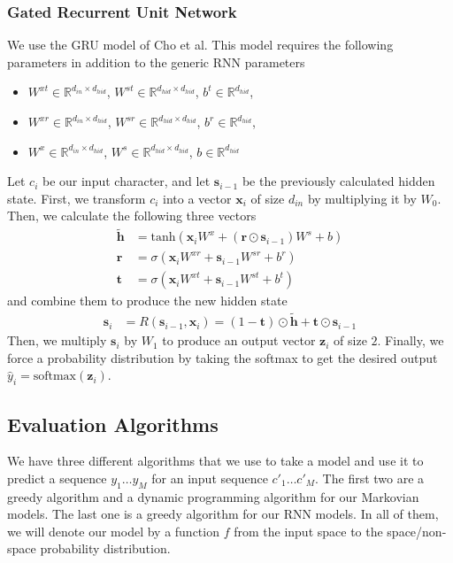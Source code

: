 \documentclass[11pt]{article}
\begin{document}
\subsubsection{Gated Recurrent Unit Network}

We use the GRU model of Cho et al. This model requires the following parameters in addition to the generic RNN parameters
\begin{itemize}
  \item $W^{xt} \in \mathbb{R}^{d_{in} \times d_{hid}}$, $W^{st} \in \mathbb{R}^{d_{hid} \times d_{hid}}$, $b^t \in \mathbb{R}^{d_{hid}}$, 
  \item $W^{xr} \in \mathbb{R}^{d_{in} \times d_{hid}}$, $W^{sr} \in \mathbb{R}^{d_{hid} \times d_{hid}}$, $b^r \in \mathbb{R}^{d_{hid}}$, 
  \item $W^x \in \mathbb{R}^{d_{in} \times d_{hid}}$, $W^s \in \mathbb{R}^{d_{hid} \times d_{hid}}$, $b \in \mathbb{R}^{d_{hid}}$
\end{itemize}

Let $c_i$ be our input character, and let $\mathbf{s}_{i-1}$ be the previously calculated hidden state. First, we transform $c_i$ into a vector $\mathbf{x}_i$ of size $d_{in}$ by multiplying it by $W_0$. Then, we calculate the following three vectors
\begin{align*}
  \widetilde{\mathbf{h}} &= \text{tanh}(\mathbf{x}_iW^{x} + (\mathbf{r} \odot \mathbf{s}_{i-1})W^s + b) \\
  \mathbf{r} &= \sigma(\mathbf{x}_iW^{xr} + \mathbf{s}_{i-1}W^{sr} + b^r) \\
  \mathbf{t} &= \sigma(\mathbf{x}_iW^{xt} + \mathbf{s}_{i-1}W^{st} + b^t)
\end{align*}
and combine them to produce the new hidden state
\begin{align*}
  \mathbf{s}_i &= R(\mathbf{s}_{i-1}, \mathbf{x}_i) = (1 - \mathbf{t}) \odot \widetilde{\mathbf{h}} + \mathbf{t} \odot \mathbf{s}_{i-1}
\end{align*}
Then, we multiply $\mathbf{s}_i$ by $W_1$ to produce an output vector $\mathbf{z}_i$ of size $2$. Finally, we force a probability distribution by taking the softmax to get the desired output $\hat{y}_i = \text{softmax}(\mathbf{z}_i)$. 
\subsection{Evaluation Algorithms}

We have three different algorithms that we use to take a model and use it to predict a sequence $y_1\dots y_M$ for an input sequence $c'_1\dots c'_M$. The first two are a greedy algorithm and a dynamic programming algorithm for our Markovian models. The last one is a greedy algorithm for our RNN models. In all of them, we will denote our model by a function $f$ from the input space to the space/non-space probability distribution. 
\end{document}
